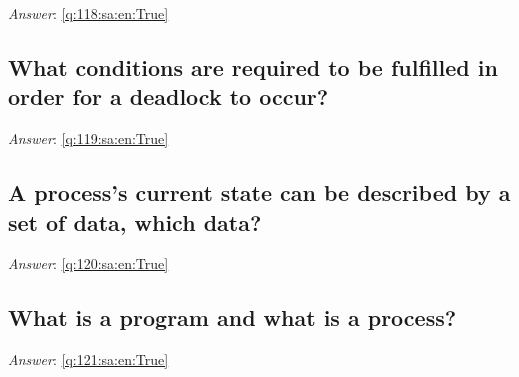 \documentclass[a4paper,11pt,oneside]{article}
\begin{document}
\begin{sloppypar}
\vspace{2cm}

\noindent\makebox[\textwidth]{\hrulefill}

\vspace{1cm}

\textit{Answer}: \autoref{q:118:sa:en:True}



\subsection{What conditions are required to be fulfilled in order for a deadlock to occur?}

\label{q:119:sa:en:False}

\vspace{2cm}

\noindent\makebox[\textwidth]{\hrulefill}

\vspace{1cm}

\textit{Answer}: \autoref{q:119:sa:en:True}



\subsection{A process's current state can be described by a set of data, which data?}

\label{q:120:sa:en:False}

\vspace{2cm}

\noindent\makebox[\textwidth]{\hrulefill}

\vspace{1cm}

\textit{Answer}: \autoref{q:120:sa:en:True}



\subsection{What is a program and what is a process?}

\label{q:121:sa:en:False}

\vspace{2cm}

\noindent\makebox[\textwidth]{\hrulefill}

\vspace{1cm}

\textit{Answer}: \autoref{q:121:sa:en:True}




\end{sloppypar}
\end{document}
